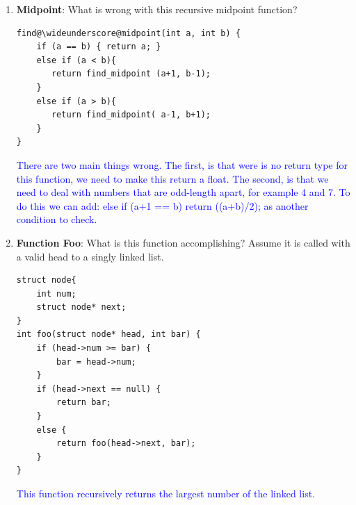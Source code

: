 \documentclass{article}
\begin{document}
\begin{enumerate}[label=(\alph*)]
\begin{lstlisting}[style=CStyle]
void mystery () {
    static int X = 5;
    int Y = 2;
    printf ("%c%c", letters[--Y], letters[X--]);
}
int main() {
    mystery();
    mystery();
    return 0;
}
 \end{lstlisting}
    \textcolor{blue}{"ECEB" is printed; On the first call to mystery(), Y is set to 2 and X is statically set to 5. The notation "--Y" means to decrement, then use the result. "X--" means the opposite. So the first call to mystery() will print letters[1], letters[5], or "EC". Then the next call Y will be set back to 2. So it will print letters[1], letters[4], or "EB". Notice that X does not get set to 5 because it is declared as static, and does not get put on the stack, instead it is put in a different section of memory.
    }
    \newpage
    \item \textbf{Midpoint}: What is wrong with this recursive midpoint function?
\begin{lstlisting}[style=CStyle] 
find@\wideunderscore@midpoint(int a, int b) {
    if (a == b) { return a; }
    else if (a < b){
       return find_midpoint (a+1, b-1);
    } 
    else if (a > b){
       return find_midpoint( a-1, b+1); 
    } 
}\end{lstlisting}  
    \textcolor{blue}{There are two main things wrong. The first, is that were is no return type for this function, we need to make this return a float. The second, is that we need to deal with numbers that are odd-length apart, for example 4 and 7. To do this we can add: else if (a+1 == b) {return ((a+b)/2);} as another condition to check. }
    \item \textbf{Function Foo}: What is this function accomplishing? Assume it is called with a valid head to a singly linked list.
\begin{lstlisting}[style=CStyle] 
struct node{
    int num;
    struct node* next;
}
int foo(struct node* head, int bar) {
    if (head->num >= bar) {
        bar = head->num;
    }
    if (head->next == null) {
        return bar;
    }
    else {
        return foo(head->next, bar);
    }
}\end{lstlisting}  
    \textcolor{blue}{This function recursively returns the largest number of the linked list.}


\end{enumerate}
\end{document}
